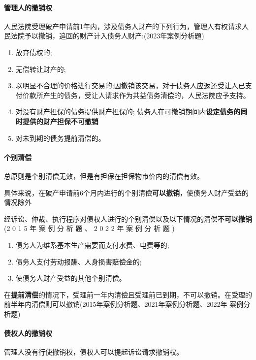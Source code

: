 \documentclass[UTF8,12pt]{ctexart}
\numberwithin{equation}{section} %
\numberwithin{figure}{section}
\numberwithin{table}{section}
\begin{document}
	\paragraph{管理人的撤销权}
	人民法院受理破产申请前1年内，涉及债务人财产的下列行为，管理人有权请求人民法院予以撤销，追回的财产计入债务人财产:(2023年案例分析题)
	\begin{enumerate}
		\item 放弃债权的;
		
		\item 无偿转让财产的;
		
		\item 以明显不合理的价格进行交易的;因撤销该交易，对于债务人应返还受让人已支 付价款所产生的债务，受让人请求作为共益债务清偿的，人民法院应予支持。
		
		\item 对没有财产担保的债务提供财产担保的; 债务人在可撤销期间内\textbf{设定债务的同时提供的财产担保不可撤销}
		
		\item 对未到期的债务提前清偿的。
	\end{enumerate}
	
	
	
	\paragraph{个别清偿}
	总原则是个别清偿无效，但是有担保在担保物市价内的清偿有效。
	
	具体来说，在破产申请前6个月内进行的个别清偿\textbf{可以撤销}，使债务人财产受益的情况除外
	
	经诉讼、仲裁、执行程序对债权人进行的个别清偿以及以下情况的清偿\textbf{不可以撤销}(2 0 1 5 年 案 例 分 析 题 、 2 0 2 2 年 案 例 分 析 题 ) 
	\begin{enumerate}
		\item 债务人为维系基本生产需要而支付水费、电费等的; 
		
		\item 债务人支付劳动报酬、人身损害赔偿金的;
		
		\item 使债务人财产受益的其他个别清偿。
	\end{enumerate}
	
	在\textbf{提前清偿}的情况下，受理前一年内清偿且受理前已到期，不可以撤销。在受理的前半年内清偿则可以撤销(2015年案例分析题、2021年案例分析题、2022年 案例分析题)

	
	\paragraph{债权人的撤销权}
	管理人没有行使撤销权，债权人可以提起诉讼请求撤销权。
	
\end{document}
